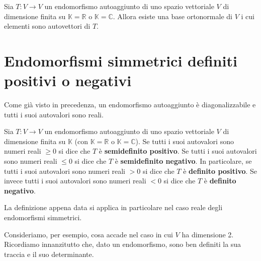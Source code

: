 \begin{theorem}
	Sia $T : V  \to V$ un endomorfismo autoaggiunto di uno spazio vettoriale $V$ di
	dimensione finita su $\mathbb{K} = \mathbb{R}$ o $\mathbb{K} = \mathbb{C}$.
	Allora esiste una base ortonormale di $V$ i cui elementi sono autovettori di $T$.
\end{theorem}


\section{Endomorfismi simmetrici definiti positivi o negativi}
Come gi\`a visto in precedenza, un endomorfismo autoaggiunto \`e diagonalizzabile e
tutti i suoi autovalori sono reali.

\begin{definition}
	Sia $T : V \to V$ un endomorfismo autoaggiunto di uno spazio vettoriale $V$ di
	dimensione finita su $\mathbb{K}$ (con $\mathbb{K} = \mathbb{R}$ o
	$\mathbb{K} = \mathbb{C}$). Se tutti i suoi autovalori sono numeri reali $\geq 0$
	si dice che $T$ \`e \textbf{semidefinito positivo}. Se tutti i suoi autovalori
	sono numeri reali $\leq 0$ si dice che $T$ \`e \textbf{semidefinito negativo}.
	In particolare, se tutti i suoi autovalori sono numeri reali $> 0$ si dice che
	$T$ \`e \textbf{definito positivo}. Se invece tutti i suoi autovalori sono numeri
	reali $< 0$ si dice che $T$ \`e \textbf{definito negativo}.
\end{definition}

La definizione appena data si applica in particolare nel caso reale degli
endomorfismi simmetrici.

Consideriamo, per esempio, cosa accade nel caso in cui $V$ ha dimensione 2.
Ricordiamo innanzitutto che, dato un endomorfismo, sono ben definiti la sua traccia
e il suo determinante.

